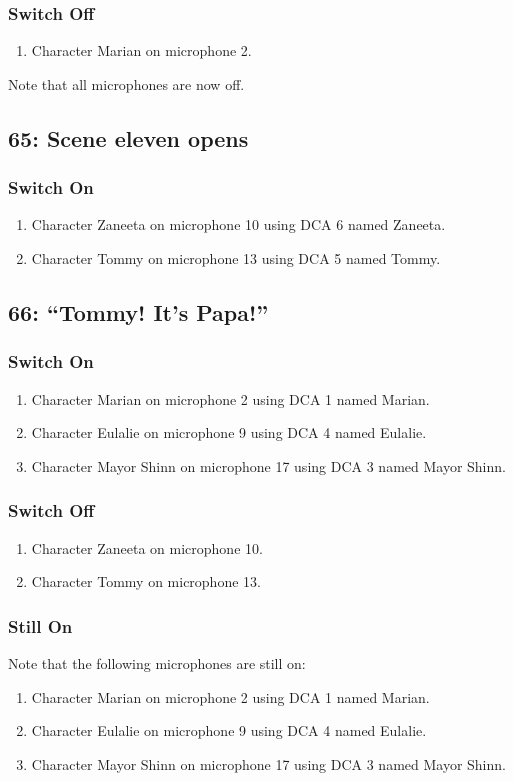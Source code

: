 \subsubsection* {Switch Off}
\begin{enumerate}
\item Character Marian on microphone 2.
\end{enumerate}
Note that all microphones are now off.
\subsection* {65: Scene eleven opens}
\subsubsection* {Switch On}
\begin{enumerate}
\item Character Zaneeta on microphone 10 using DCA 6 named Zaneeta.
\item Character Tommy on microphone 13 using DCA 5 named Tommy.
\end{enumerate}
\subsection* {66: ``Tommy!  It's Papa!''}
\subsubsection* {Switch On}
\begin{enumerate}
\item Character Marian on microphone 2 using DCA 1 named Marian.
\item Character Eulalie on microphone 9 using DCA 4 named Eulalie.
\item Character Mayor Shinn on microphone 17 using DCA 3 named Mayor Shinn.
\end{enumerate}
\subsubsection* {Switch Off}
\begin{enumerate}
\item Character Zaneeta on microphone 10.
\item Character Tommy on microphone 13.
\end{enumerate}
\subsubsection* {Still On}
Note that the following microphones are still on:
\begin{enumerate}
\item Character Marian on microphone 2 using DCA 1 named Marian.
\item Character Eulalie on microphone 9 using DCA 4 named Eulalie.
\item Character Mayor Shinn on microphone 17 using DCA 3 named Mayor Shinn.
\end{enumerate}
